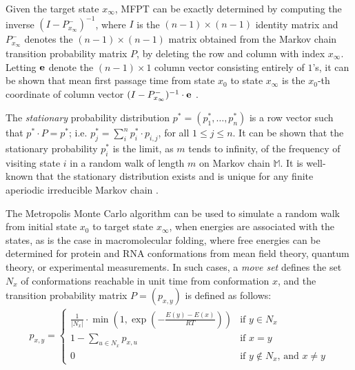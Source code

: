 Given the target state $x_{\infty}$, MFPT can be exactly
determined by computing the inverse
$(I - P^{-}_{x_{\infty}})^{-1}$, where $I$ is the $(n-1)\times (n-1)$ identity
matrix and $P^{-}_{x_{\infty}}$
denotes the $(n-1)\times (n-1)$ matrix obtained from the
Markov chain transition probability matrix $P$,
by deleting the row and column with index $x_{\infty}$.
Letting ${\bf e}$ denote the
$(n-1) \times 1$ column vector consisting entirely of $1$'s, it can be
shown that mean first passage time from state $x_0$ to state $x_{\infty}$
is the $x_0$-th coordinate
of column vector
$(I - P^{-}_{x_{\infty}})^{-1} \cdot {\bf e}$ \cite{meyerMFPT}.


The {\em stationary} probability distribution $p^* = (p^*_1,\ldots,p^*_n)$
is a row vector such that $p^* \cdot P = p^*$; i.e.
$p^*_j = \sum_{i}^n p^*_i \cdot p_{i,j}$, for all $1\leq j \leq n$.
It can be shown that the stationary probability $p^*_i$ is the limit,
as $m$ tends to infinity, of the frequency of visiting state $i$ in a
random walk of length $m$ on Markov chain $\mathbb{M}$.
It is well-known that the stationary distribution exists and is unique
for any finite aperiodic irreducible Markov chain \cite{cloteBackofen:book}.

The Metropolis Monte Carlo algorithm \cite{metropolis:MonteCarlo} can
be used to simulate a random walk from initial state $x_0$ to target state
$x_{\infty}$, when energies are associated with the states, as is the case in
macromolecular folding, where free energies can be determined for
protein and RNA conformations from mean field theory, quantum theory,
or experimental measurements. In such cases, a {\em move set}
defines the set $N_x$ of conformations reachable in unit time
from conformation $x$, and the transition probability matrix
$P = (p_{x,y})$ is defined as follows:
\begin{eqnarray}
\label{eqn:transitionProb1}
p_{x,y} = \left\{
\begin{array}{ll}
\frac{1}{|N_x|} \cdot \min\left(1,\exp(-\frac{E(y)-E(x)}{RT})\right)
&\mbox{if $y \in N_x$}\\
1 - \sum_{u \in N_x} p_{x,u} &\mbox{if $x=y$}\\
0 &\mbox{if $y \not\in N_x$, and $x \ne y$}
\end{array} \right.
\end{eqnarray}

